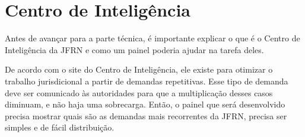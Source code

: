 \chapter{Centro de Inteligência}\label{cap_trabalho_academico}

Antes de avançar para a parte técnica, é importante explicar o que é o Centro de Inteligência da JFRN e como um painel poderia ajudar na tarefa deles.

De acordo com o site do Centro de Inteligência, ele existe para otimizar o trabalho jurisdicional a partir de demandas repetitivas. Esse tipo de demanda deve ser comunicado às autoridades para que a multiplicação desses casos diminuam, e não haja uma sobrecarga. Então, o painel que será desenvolvido precisa mostrar quais são as demandas mais recorrentes da JFRN, precisa ser simples e de fácil distribuição.

